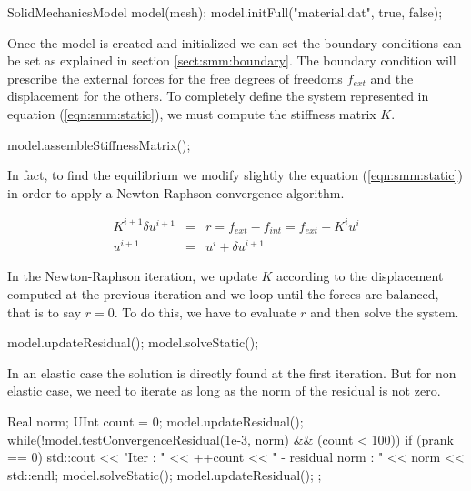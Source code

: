\documentclass[a4paper,11pt]{book}
\begin{document}
\begin{cpp}
  SolidMechanicsModel model(mesh);
  model.initFull("material.dat", true, false);
\end{cpp}

Once the model is created and initialized we can set the boundary conditions can
be set as explained  in section \ref{sect:smm:boundary}.  The boundary condition
will prescribe  the external forces for  the free degrees  of freedoms $f_{ext}$
and  the  displacement  for  the   others.   To  completely  define  the  system
represented in  equation (\ref{eqn:smm:static}),  we must compute  the stiffness
matrix $K$. 

\begin{cpp}
  model.assembleStiffnessMatrix();
\end{cpp}

In   fact,  to   find  the   equilibrium   we  modify   slightly  the   equation
(\ref{eqn:smm:static}) in order to apply a Newton-Raphson convergence algorithm.

\begin{eqnarray}\label{eq:smm:static-newton-raphson}
  K^{i+1} \delta u^{i+1} &=& r = f_{ext} - f_{int} = f_{ext} - K^{i} u^{i}\\
  u^{i+1} &=& u^{i} + \delta u^{i+1}
\end{eqnarray}

In the  Newton-Raphson iteration,  we update $K$  according to  the displacement
computed at  the previous iteration and  we loop until the  forces are balanced,
that is to say $r  = 0$. To do this, we have to evaluate  $r$ and then solve the
system.

\begin{cpp}
  model.updateResidual();
  model.solveStatic();
\end{cpp}

In an  elastic case the solution is  directly found at the  first iteration. But
for non elastic case, we need to iterate  as long as the norm of the residual is
not zero.
\begin{cpp}
  Real norm;
  UInt count = 0;
  model.updateResidual();
  while(!model.testConvergenceResidual(1e-3, norm) && (count < 100)) {
    if (prank == 0)
      std::cout << "Iter : " << ++count
                << " - residual norm : "
                << norm << std::endl;
    model.solveStatic();
    model.updateResidual();
  };
\end{cpp}
\end{document}

